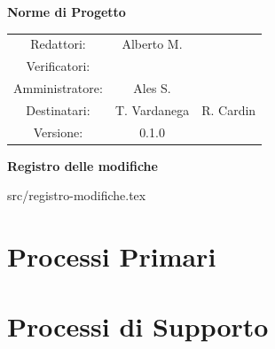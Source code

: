 \documentclass[a4paper, 11pt]{article}
\begin{document}
\begin{center}
\begin{Huge}
        \textbf{Norme di Progetto} \\
        \vspace{4mm}

\end{Huge}

\vspace{20mm}

\begin{large}
\begin{spacing}{1.4}
\begin{tabular}{c c c}
   Redattori: & Alberto M. & \\
   Verificatori: & & \\
   Amministratore: & Ales S. & \\
   Destinatari: & T. Vardanega & R. Cardin \\
   Versione: & 0.1.0 &
\end{tabular}
\end{spacing}
\end{large}
\end{center}

\pagebreak

\begin{huge}
    \textbf{Registro delle modifiche}
\end{huge}
\vspace{5pt}

 {src/registro-modifiche.tex}

\pagebreak
\tableofcontents
\pagebreak


\pagebreak

\section{Processi Primari}











\pagebreak

\section{Processi di Supporto}
\end{document}
